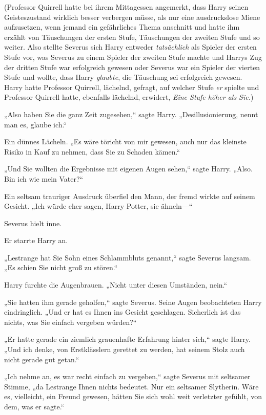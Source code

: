 {(Professor Quirrell hatte bei ihrem Mittagessen angemerkt, dass Harry seinen Geisteszustand wirklich besser verbergen müsse, als nur eine ausdruckslose Miene aufzusetzen, wenn jemand ein gefährliches Thema anschnitt und hatte ihm erzählt von Täuschungen der ersten Stufe, Täuschungen der zweiten Stufe und so weiter. Also stellte Severus sich Harry entweder \emph{tatsächlich} als Spieler der ersten Stufe vor, was Severus zu einem Spieler der zweiten Stufe machte und Harrys Zug der dritten Stufe war erfolgreich gewesen oder Severus war ein Spieler der vierten Stufe und wollte, dass Harry \emph{glaubte}, die Täuschung sei erfolgreich gewesen. Harry hatte Professor Quirrell, lächelnd, gefragt, auf welcher Stufe \emph{er} spielte und Professor Quirrell hatte, ebenfalls lächelnd, erwidert, \emph{Eine Stufe höher als Sie.})

„Also haben Sie die ganz Zeit zugesehen,“ sagte Harry. „Desillusionierung, nennt man es, glaube ich.“

Ein dünnes Lächeln. „Es wäre töricht von mir gewesen, auch nur das kleinste Risiko in Kauf zu nehmen, dass Sie zu Schaden kämen.“

„Und Sie wollten die Ergebnisse mit eigenen Augen sehen,“ sagte Harry. „Also. Bin ich wie mein Vater?“

Ein seltsam trauriger Ausdruck überfiel den Mann, der fremd wirkte auf seinem Gesicht. „Ich würde eher sagen, Harry Potter, sie ähneln—“

Severus hielt inne.

Er starrte Harry an.

„Lestrange hat Sie Sohn eines Schlammbluts genannt,“ sagte Severus langsam. „Es schien Sie nicht groß zu stören.“

Harry furchte die Augenbrauen. „Nicht unter diesen Umständen, nein.“

„Sie hatten ihm gerade geholfen,“ sagte Severus. Seine Augen beobachteten Harry eindringlich. „Und er hat es Ihnen ins Gesicht geschlagen. Sicherlich ist das nichts, was Sie einfach vergeben würden?“

„Er hatte gerade ein ziemlich grauenhafte Erfahrung hinter sich,“ sagte Harry. „Und ich denke, von Erstklässlern gerettet zu werden, hat seinem Stolz auch nicht gerade gut getan.“

„Ich nehme an, es war recht einfach zu vergeben,“ sagte Severus mit seltsamer Stimme, „da Lestrange Ihnen nichts bedeutet. Nur ein seltsamer Slytherin. Wäre es, vielleicht, ein Freund gewesen, hätten Sie sich wohl weit verletzter gefühlt, von dem, was er sagte.“

}
